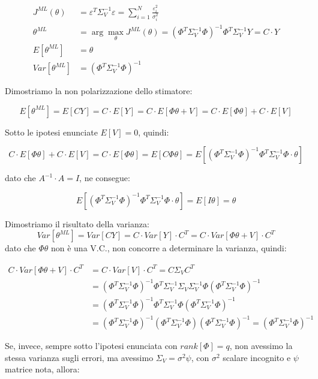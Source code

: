   \begin{align*}
    J^{ML}(\theta)&=\varepsilon ^T \Sigma_V^{-1}\varepsilon = \sum_{i=1}^{N}{\frac{\varepsilon_i^2}{\sigma_i^2} }\\
    \theta^{ML}&= \arg \max_{\theta} J^{ML}(\theta)=(\Phi^T\Sigma_V^{-1}\Phi)^{-1}\Phi^T\Sigma_V^{-1}Y=C \cdot Y\\
    E[{\theta^{ML}}]&=\theta \\
    Var[\theta^{ML}]&=(\Phi^T\Sigma_V^{-1}\Phi)^{-1}
  \end{align*}
  

\begin{dimostrazione} %
Dimostriamo la non polarizzazione dello stimatore:

  \[ E[\theta^{ML}]=E[CY]=C\cdot E[Y]=C\cdot E[\Phi\theta+V]=C\cdot E[\Phi\theta]+C\cdot E[V] \]
  
Sotto le ipotesi enunciate $E[V]=0$, quindi:

  \[ C\cdot E[\Phi\theta]+C\cdot E[V]=C\cdot E[\Phi\theta]=E[C\Phi\theta]=E\left[(\Phi^T\Sigma_V^{-1}\Phi)^{-1}\Phi^T\Sigma_V^{-1}\Phi\cdot\theta \right] \]
  
dato che $A^{-1}\cdot A=I$, ne consegue:

  \[ E\left[(\Phi^T\Sigma_V^{-1}\Phi)^{-1}\Phi^T\Sigma_V^{-1}\Phi\cdot\theta \right]=E[I\theta]=\theta \]
\end{dimostrazione}
\begin{dimostrazione} %
Dimostriamo il risultato della varianza:
  \[ Var[\theta^{ML}]=Var[CY]=C\cdot Var[Y]\cdot C^T = C\cdot Var[\Phi\theta+V]\cdot C^T \]
dato che $\Phi\theta$ non è una V.C., non concorre a determinare la varianza, quindi:

  \[ 
  \begin{split}
      C\cdot Var[\Phi\theta+V]\cdot C^T&=C\cdot Var[V]\cdot C^T=C\Sigma_VC^T\\
      &=(\Phi^T\Sigma_V^{-1}\Phi)^{-1}\Phi^T\Sigma_V^{-1}\Sigma_V \Sigma_V^{-1} \Phi(\Phi^T\Sigma_V^{-1}\Phi)^{-1}\\
      &=(\Phi^T\Sigma_V^{-1}\Phi)^{-1}\Phi^T \Sigma_V^{-1} \Phi(\Phi^T\Sigma_V^{-1}\Phi)^{-1}\\
      &=(\Phi^T\Sigma_V^{-1}\Phi)^{-1}(\Phi^T \Sigma_V^{-1} \Phi)(\Phi^T\Sigma_V^{-1}\Phi)^{-1}=(\Phi^T\Sigma_V^{-1}\Phi)^{-1}
  \end{split} 
  \]
\end{dimostrazione}

Se, invece, sempre sotto l'ipotesi enunciata con $rank[\Phi]=q$, non avessimo la stessa varianza sugli errori, ma avessimo $\Sigma_V=\sigma^2\psi$, con $\sigma^2$ scalare incognito e $\psi$ matrice nota, allora:

